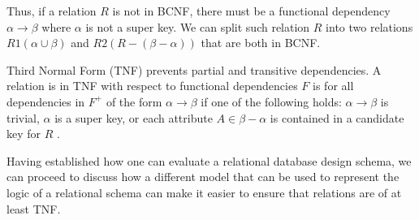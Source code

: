 Thus, if a relation $R$ is not in BCNF, there must be a functional dependency $\alpha \rightarrow \beta$ where $\alpha$ is not a super key. 
We can split such relation $R$ into two relations $R1(\alpha \cup \beta)$ and $R2(R-(\beta-\alpha))$ that are both in BCNF.

Third Normal Form (TNF) prevents partial and transitive dependencies\cite{MontayaNormalForms}.
A relation is in TNF with respect to functional dependencies $F$ is for all dependencies in $F^+$ of the form $\alpha \rightarrow \beta$ if one of the following holds: 
$\alpha \rightarrow \beta$ is trivial, $\alpha$ is a super key, or each attribute $A \in \beta-\alpha$ is contained in a candidate key for $R$ \cite{DBSBook}.

Having established how one can evaluate a relational database design schema, we can proceed to discuss how a different model that can be used to represent the logic of a relational schema can make it easier to ensure that relations are of at least TNF.
